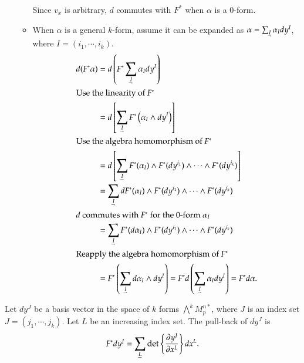 \documentclass[11pt, a4paper]{book}
\begin{document}
\begin{enumerate}
\begin{Proof}
\begin{itemize}
      Since $v_x$ is arbitrary, $d$ commutes with $F^{*}$ when $\alpha$ is a 0-form.
    \item When $\alpha$ is a general $k$-form, assume it can be expanded as
      $\alpha = \sum_{\underaccent{\rightharpoondown}{I}} \alpha_I dy^{I}$, where
      $I = (i_1,\cdots,i_k)$.
      \begin{align*}
        d(F^{*}\alpha)
        &= d \left( F^{*}\sum_{\underaccent{\rightharpoondown}{I}}
          \alpha_I dy^I \right) \\
        \intertext{Use the linearity of $F^{*}$}
        &= d \left[
          \sum_{\underaccent{\rightharpoondown}{I}} F^{*} \left( \alpha_I \wedge dy^I
          \right) \right] \\
        \intertext{Use the algebra homomorphism of $F^{*}$}
        &= d \left[ \sum_{\underaccent{\rightharpoondown}{I}} F^{*}(\alpha_I) \wedge
          F^{*}(dy^{i_1}) \wedge \cdots \wedge F^{*}(dy^{i_k}) \right] \\
        &= \sum_{\underaccent{\rightharpoondown}{I}} d F^{*}(\alpha_I) \wedge
          F^{*}(dy^{i_1}) \wedge \cdots \wedge F^{*}(dy^{i_k}) \\
        \intertext{$d$ commutes with $F^{*}$ for the 0-form $\alpha_I$}
        &= \sum_{\underaccent{\rightharpoondown}{I}} F^{*}(d\alpha_I) \wedge
          F^{*}(dy^{i_1}) \wedge \cdots \wedge F^{*}(dy^{i_k}) \\
        \intertext{Reapply the algebra homomorphism of $F^{*}$}
        &= F^{*} \left( \sum_{\underaccent{\rightharpoondown}{I}} d\alpha_I \wedge dy^I \right) =
          F^{*} d \left( \sum_{\underaccent{\rightharpoondown}{I}} \alpha_I dy^I \right) =
          F^{*} d\alpha.
      \end{align*}
    \end{itemize}
  \end{Proof}
\end{enumerate}

\begin{Proposition}
  \label{prop:pullback-of-basis}
  Let $dy^J$ be a basis vector in the space of $k$ forms $\bigwedge^k M_p^{n*}$, where $J$
  is an index set $J=(j_1,\cdots,j_k)$. Let $L$ be an increasing index set. The pull-back
  of $dy^J$ is
  \begin{equation}
    \label{eq:pullback-of-basis}
    F^{*}dy^J = \sum_{\underaccent{\rightharpoondown}{L}} \det \left\{
      \frac{\pdiff y^J}{\pdiff x^L} \right\} dx^L.
  \end{equation}
\end{Proposition}
\end{document}
